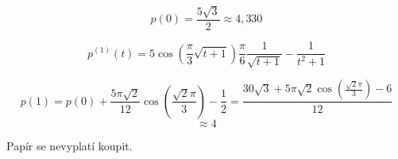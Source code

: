 \documentclass[10pt,a4paper]{article}
\theoremstyle{plain}
\theoremstyle{definition}
\begin{document}
\section{}

\[ p(0) = \frac{5\sqrt{3}}{2} \approx 4,330 \]

\[ p^{(1)}(t) =  5 \cos\left(\frac{\pi}{3}\sqrt{t+1}\right)\frac{\pi}{6}\frac1{\sqrt{t+1}} - \frac1{t^2 + 1} \]

\[ p(1) = p(0) +  \frac{5\pi\sqrt{2}}{12} \cos\left(\frac{\sqrt{2}\pi}{3}\right) - \frac12 =  \frac{30\sqrt{3} + 5\pi\sqrt{2} \cos\left(\frac{\sqrt{2}\pi}{3}\right) - 6 }{12} \]\[
\approx 4
\]

Papír se nevyplatí koupit.
\end{document}
